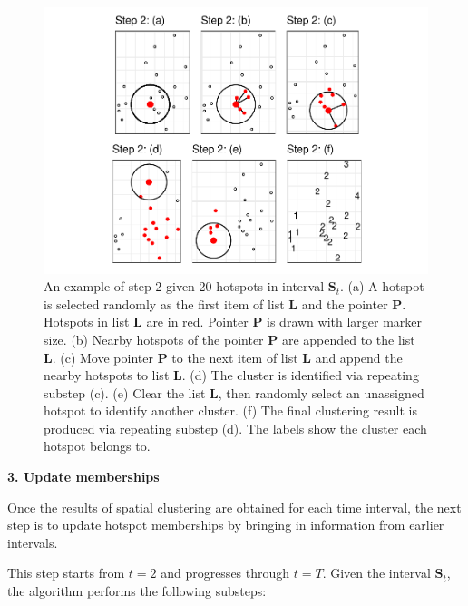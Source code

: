 \begin{Schunk}
\begin{figure}

{\centering \includegraphics[width=0.8\linewidth]{clustering_paper_files/figure-latex/step2figs-1} 

}

\caption{An example of step 2 given 20 hotspots in interval $\boldsymbol{S}_t$. (a) A hotspot is selected randomly as the first item of list $\boldsymbol{L}$ and the pointer $\boldsymbol{P}$. Hotspots in list $\boldsymbol{L}$ are in red. Pointer $\boldsymbol{P}$ is drawn with larger marker size. (b) Nearby hotspots of the pointer $\boldsymbol{P}$ are appended to the list $\boldsymbol{L}$. (c) Move pointer $\boldsymbol{P}$ to the next item of list $\boldsymbol{L}$ and append the nearby hotspots to list $\boldsymbol{L}$. (d) The cluster is identified via repeating substep (c). (e) Clear the list $\boldsymbol{L}$, then randomly select an unassigned hotspot to identify another cluster. (f) The final clustering result is produced via repeating substep (d). The labels show the cluster each hotspot belongs to.}\label{fig:step2figs}
\end{figure}
\end{Schunk}

\textbf{3. Update memberships}

Once the results of spatial clustering are obtained for each time
interval, the next step is to update hotspot memberships by bringing in
information from earlier intervals.

This step starts from \(t=2\) and progresses through \(t=T\). Given the
interval \(\boldsymbol{S}_t\), the algorithm performs the following
substeps:

